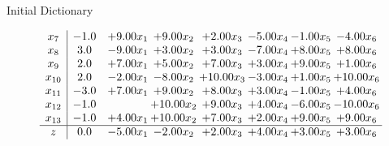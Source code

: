 \documentclass[8pt]{article}
\begin{document}
Initial Dictionary 

\[\begin{array}{c| c c@{\hskip 2pt} c@{\hskip 2pt} c@{\hskip 2pt} c@{\hskip 2pt} c@{\hskip 2pt} c@{\hskip 2pt} }
 x_{7}   &  -1.0 & +  9.00 x_{1} & +  9.00 x_{2} & +  2.00 x_{3} & -5.00 x_{4} & -1.00 x_{5} & -4.00 x_{6}\\
 x_{8}   &  3.0 & -9.00 x_{1} & +  3.00 x_{2} & +  3.00 x_{3} & -7.00 x_{4} & +  8.00 x_{5} & +  8.00 x_{6}\\
 x_{9}   &  2.0 & +  7.00 x_{1} & +  5.00 x_{2} & +  7.00 x_{3} & +  3.00 x_{4} & +  9.00 x_{5} & +  1.00 x_{6}\\
 x_{10}   &  2.0 & -2.00 x_{1} & -8.00 x_{2} & + 10.00 x_{3} & -3.00 x_{4} & +  1.00 x_{5} & + 10.00 x_{6}\\
 x_{11}   &  -3.0 & +  7.00 x_{1} & +  9.00 x_{2} & +  8.00 x_{3} & +  3.00 x_{4} & -1.00 x_{5} & +  4.00 x_{6}\\
 x_{12}   &  -1.0  &   & + 10.00 x_{2} & +  9.00 x_{3} & +  4.00 x_{4} & -6.00 x_{5} & -10.00 x_{6}\\
 x_{13}   &  -1.0 & +  4.00 x_{1} & + 10.00 x_{2} & +  7.00 x_{3} & +  2.00 x_{4} & +  9.00 x_{5} & +  9.00 x_{6}\\
\hline
z    &  0.0 & -5.00 x_{1} & -2.00 x_{2} & +  2.00 x_{3} & +  4.00 x_{4} & +  3.00 x_{5} & +  3.00 x_{6}\\
\end{array}\]
\end{document}
